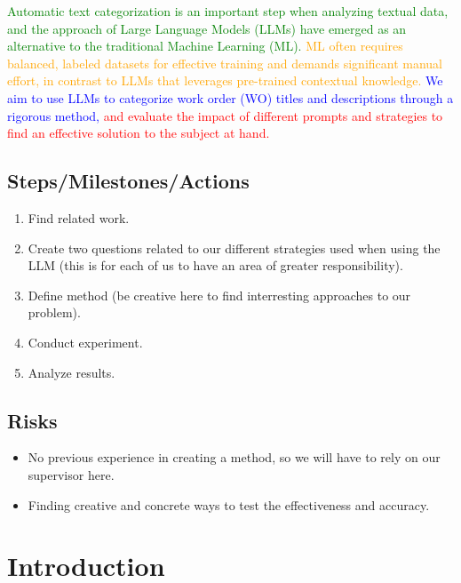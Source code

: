 \documentclass{article}
\begin{document}
\textcolor{green}{
      Automatic text categorization is an important step when analyzing textual data,
      and the approach of Large Language Models (LLMs) have emerged as an alternative
      to the traditional Machine Learning (ML).
}
\textcolor{orange}{
      ML often requires balanced, labeled datasets for effective training
      and demands significant manual effort, in contrast to LLMs that
      leverages pre-trained contextual knowledge.
}
\textcolor{blue}{
      We aim to use LLMs to categorize work order (WO) titles and descriptions
      through a rigorous method,
}
\textcolor{red}{
      and evaluate the impact of different prompts and strategies to find
      an effective solution to the subject at hand.
}

\subsection{Steps/Milestones/Actions}

\begin{enumerate}
      \item Find related work.
      \item Create two questions related to our different strategies used
            when using the LLM (this is for each of us to have an area of
            greater responsibility).
      \item Define method (be creative here to find interresting approaches
            to our problem).
      \item Conduct experiment.
      \item Analyze results.
\end{enumerate}

\subsection{Risks}

\begin{itemize}
      \item No previous experience in creating a method, so we will have to rely on our
            supervisor here.
      \item Finding creative and concrete ways to test the effectiveness and accuracy.
\end{itemize}

\section{Introduction}
\end{document}
